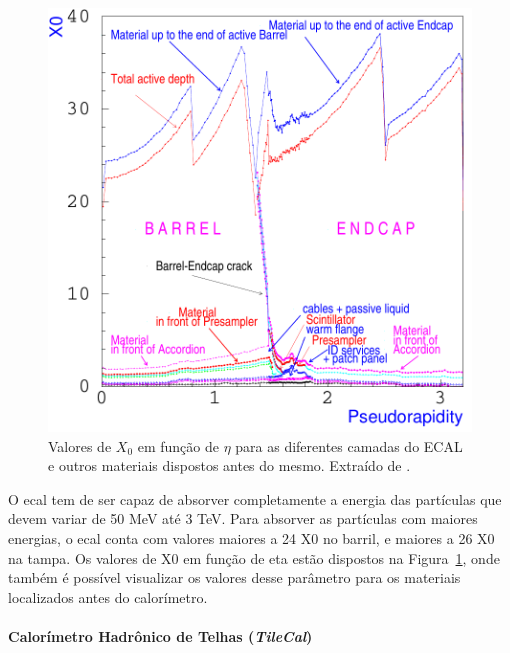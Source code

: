 \begin{figure}[h!t]
\centering
\includegraphics[width=.6\textwidth]{imagens/cal_em_x0.pdf}
\caption[Valores de $X_0$ em função de $\eta$ para as diferentes camadas do ECAL
e outros materiais dispostos antes do mesmo]{Valores de $X_0$ em função de $\eta$ para as diferentes camadas do ECAL
e outros materiais dispostos antes do mesmo. Extraído de \cite{cal_tdr}.}
\label{fig:cal_em_x0}
\end{figure}


O \gls{ecal} tem de ser capaz de absorver completamente a energia
das partículas que devem variar de 50 MeV até 3 TeV. 
Para absorver as partículas com maiores energias, o \gls{ecal} conta com valores
maiores a 24 \gls{X0} no barril, e maiores a 26 \gls{X0} na tampa. Os valores de \gls{X0} em 
função de \gls{eta} estão dispostos na Figura~\ref{fig:cal_em_x0}, onde também é possível
visualizar os valores desse parâmetro para os materiais localizados antes do
calorímetro.

\paragraph{Calorímetro Hadrônico de Telhas (\emph{TileCal})}
\label{par:cal_tilecal}



